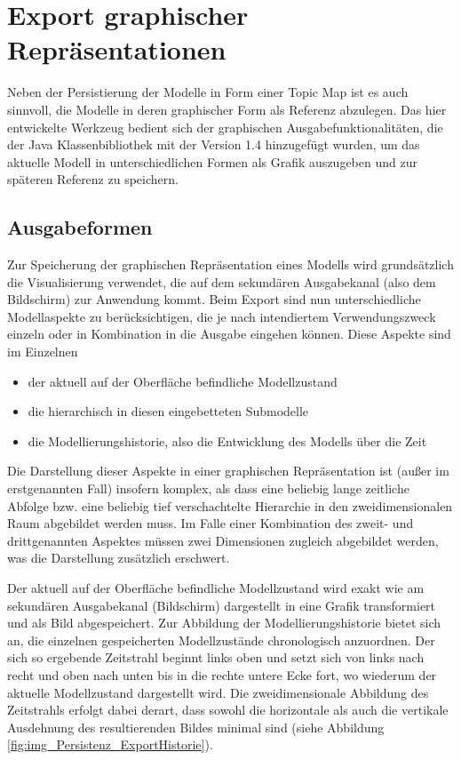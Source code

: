 \section{Export graphischer Repräsentationen} %
\label{sec:export_graphischer_repräsentationen}

Neben der Persistierung der Modelle in Form einer Topic Map ist es auch sinnvoll, die Modelle in deren graphischer Form als Referenz abzulegen. Das hier entwickelte Werkzeug bedient sich der graphischen Ausgabefunktionalitäten, die der Java Klassenbibliothek mit der Version 1.4 hinzugefügt wurden, um das aktuelle Modell in unterschiedlichen Formen als Grafik auszugeben und zur späteren Referenz zu speichern.

\subsection{Ausgabeformen} %
\label{sub:ausgabeformen}

Zur Speicherung der graphischen Repräsentation eines Modells wird grundsätzlich die Visualisierung verwendet, die auf dem sekundären Ausgabekanal (also dem Bildschirm) zur Anwendung kommt. Beim Export sind nun unterschiedliche Modellaspekte zu berücksichtigen, die je nach intendiertem Verwendungszweck einzeln oder in Kombination in die Ausgabe eingehen können. Diese Aspekte sind im Einzelnen
\begin{itemize}
	\item der aktuell auf der Oberfläche befindliche Modellzustand
	\item die hierarchisch in diesen eingebetteten Submodelle
	\item die Modellierungshistorie, also die Entwicklung des Modells über die Zeit
\end{itemize}

Die Darstellung dieser Aspekte in einer graphischen Repräsentation ist (außer im erstgenannten Fall) insofern komplex, als dass eine beliebig lange zeitliche Abfolge bzw. eine beliebig tief verschachtelte Hierarchie in den zweidimensionalen Raum abgebildet werden muss. Im Falle einer Kombination des zweit- und drittgenannten Aspektes müssen zwei Dimensionen zugleich abgebildet werden, was die Darstellung zusätzlich erschwert.

Der aktuell auf der Oberfläche befindliche Modellzustand wird exakt wie am sekundären Ausgabekanal (Bildschirm) dargestellt in eine Grafik transformiert und als Bild abgespeichert. Zur Abbildung der Modellierungshistorie bietet sich an, die einzelnen gespeicherten Modellzustände chronologisch anzuordnen. Der sich so ergebende Zeitstrahl beginnt links oben und setzt sich von links nach recht und oben nach unten bis in die rechte untere Ecke fort, wo wiederum der aktuelle Modellzustand dargestellt wird. Die zweidimensionale Abbildung des Zeitstrahls erfolgt dabei derart, dass sowohl die horizontale als auch die vertikale Ausdehnung des resultierenden Bildes minimal sind (siehe Abbildung \ref{fig:img_Persistenz_ExportHistorie}).


